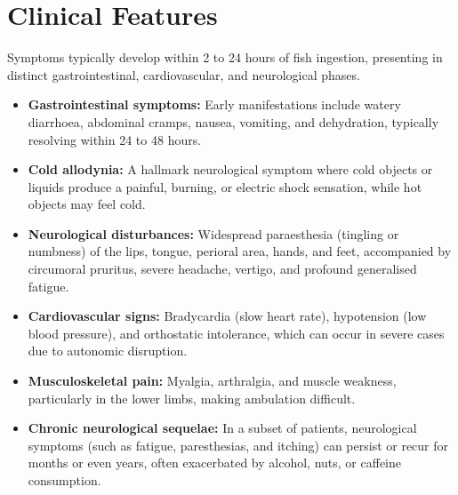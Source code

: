 \section*{Clinical Features}
Symptoms typically develop within 2 to 24 hours of fish ingestion, presenting in distinct gastrointestinal, cardiovascular, and neurological phases.
\begin{itemize}
    \item \textbf{Gastrointestinal symptoms:} Early manifestations include watery diarrhoea, abdominal cramps, nausea, vomiting, and dehydration, typically resolving within 24 to 48 hours.
    \item \textbf{Cold allodynia:} A hallmark neurological symptom where cold objects or liquids produce a painful, burning, or electric shock sensation, while hot objects may feel cold.
    \item \textbf{Neurological disturbances:} Widespread paraesthesia (tingling or numbness) of the lips, tongue, perioral area, hands, and feet, accompanied by circumoral pruritus, severe headache, vertigo, and profound generalised fatigue.
    \item \textbf{Cardiovascular signs:} Bradycardia (slow heart rate), hypotension (low blood pressure), and orthostatic intolerance, which can occur in severe cases due to autonomic disruption.
    \item \textbf{Musculoskeletal pain:} Myalgia, arthralgia, and muscle weakness, particularly in the lower limbs, making ambulation difficult.
    \item \textbf{Chronic neurological sequelae:} In a subset of patients, neurological symptoms (such as fatigue, paresthesias, and itching) can persist or recur for months or even years, often exacerbated by alcohol, nuts, or caffeine consumption.
\end{itemize}


